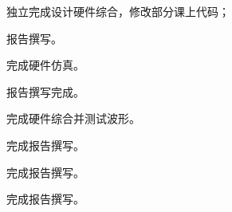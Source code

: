 \documentclass[lang=cn,newtx,10pt,scheme=chinese]{elegantbook}
\begin{document}
\begin{change}
\item 独立完成设计硬件综合，修改部分课上代码；
\item 报告撰写。
\end{change}

\begin{change}
  \item 完成硬件仿真。
  \item 报告撰写完成。
\end{change}

\begin{change}
  \item 完成硬件综合并测试波形。
  \item 完成报告撰写。
\end{change}

\begin{change}
  \item 完成报告撰写。
\end{change}


\begin{change}
  \item 完成报告撰写。
\end{change}
\end{document}
